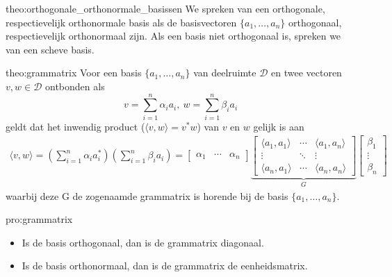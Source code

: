 \begin{theo}{theo:orthogonale_orthonormale_basissen}
    We spreken van een orthogonale, respectievelijk orthonormale basis als de basisvectoren $\{a_1, \ldots, a_n\}$ orthogonaal, respectievelijk orthonormaal zijn. Als een basis niet orthogonaal is, spreken we van een scheve basis.
\end{theo}

\begin{theo}[Grammatrix]{theo:grammatrix}
    Voor een basis $\{a_1, \ldots, a_n\}$ van deelruimte $\mathcal{D}$ en twee vectoren $v, w \in \mathcal{D}$ ontbonden als
    \begin{equation*}
            v = \sum_{i=1}^{n} \alpha_i a_i, \
            w = \sum_{i=1}^{n} \beta_i a_i
    \end{equation*}
    geldt dat het inwendig product ($\langle v, w \rangle = v^*w$) van $v$ en $w$ gelijk is aan
    \begin{align*}
        \langle v, w \rangle 
            = \left( \sum_{i=1}^{n} \alpha_i a_i^* \right)\left( \sum_{i=1}^{n} \beta_i a_i \right) 
            = 
                \begin{bmatrix} \alpha_1 & \cdots & \alpha_n \end{bmatrix} 
                \underbrace{\begin{bmatrix} \langle a_1, a_1 \rangle & \cdots & \langle a_1, a_n \rangle \\ \vdots & \ddots & \vdots \\ \langle a_n, a_1 \rangle & \cdots & \langle a_n, a_n \rangle \end{bmatrix}}_{G} 
                \begin{bmatrix} \beta_1 \\ \vdots \\ \beta_n \end{bmatrix}
    \end{align*}
    waarbij deze G de zogenaamde grammatrix is horende bij de basis $\{a_1, \ldots, a_n\}$. 
\end{theo}

\begin{pro}[Grammatrix]{pro:grammatrix}
    \begin{itemize}
        \item Is de basis orthogonaal, dan is de grammatrix diagonaal.
        \item Is de basis orthonormaal, dan is de grammatrix de eenheidsmatrix.
    \end{itemize}
\end{pro}

